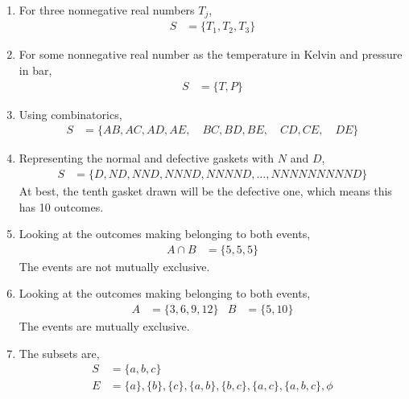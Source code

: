\begin{enumerate}
    \item For three nonnegative real numbers $ T_j $,
          \begin{align}
              S & = \{T_1, T_2, T_3\}
          \end{align}

    \item For some nonnegative real number as the temperature in Kelvin and
          pressure in bar,
          \begin{align}
              S & = \{T, P\}
          \end{align}

    \item Using combinatorics,
          \begin{align}
              S & = \{AB,AC,AD,AE,\quad BC,BD,BE,\quad CD,CE,\quad DE\}
          \end{align}

    \item Representing the normal and defective gaskets with $ N $ and $ D $,
          \begin{align}
              S & = \{D, ND, NND, NNND, NNNND, \dots, NNNNNNNNND\}
          \end{align}
          At best, the tenth gasket drawn will be the defective one, which means this
          has 10 outcomes.

    \item Looking at the outcomes making belonging to both events,
          \begin{align}
              A \cap B & = \{5,5,5\}
          \end{align}
          The events are not mutually exclusive.

    \item Looking at the outcomes making belonging to both events,
          \begin{align}
              A & = \{3,6,9,12\} & B & = \{5,10\}
          \end{align}
          The events are mutually exclusive.

    \item The subsets are,
          \begin{align}
              S & = \{a,b,c\}                                                       \\
              E & = \{a\}, \{b\}, \{c\}, \{a,b\}, \{b,c\}, \{a,c\}, \{a,b,c\}, \phi
          \end{align}


\end{enumerate}
